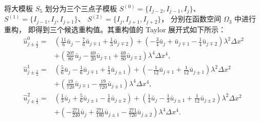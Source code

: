 \documentclass[12pt,a4paper]{article}
\numberwithin{equation}{section}    %
\begin{document}
将大模板 $S_5$ 划分为三个三点子模板
$S^{(0)} = \{I_{j-2}, I_{j-1}, I_j\}$、
$S^{(1)} = \{I_{j-1}, I_j, I_{j+1}\}$、
$S^{(2)} = \{I_j, I_{j+1}, I_{j+2}\}$，
分别在函数空间 $\Omega_3$ 中进行重构，
即得到三个候选重构值。其重构值的 Taylor 展开式如下所示：
\begin{equation}
    \label{eq:substencil_half}
    \begin{aligned}
        \hat{u}^0_{j\pm\frac{1}{2}}
        = & \left(\frac{11}{6}\bar{u}_j - \frac{7}{6}\bar{u}_{j\mp 1}
            + \frac{1}{3}\bar{u}_{j\mp 2}\right)
          + \left(-\frac{3}{4}\bar{u}_j + \bar{u}_{j\mp 1}
            - \frac{1}{4}\bar{u}_{j\mp 2}\right)\lambda^2\Delta x^2 \\
          & + \left(\frac{207}{80}\bar{u}_j - \frac{69}{20}\bar{u}_{j\mp 1}
            + \frac{69}{80}\bar{u}_{j\mp 2}\right)\lambda^4\Delta x^4, \\[6pt]
        \hat{u}^1_{j\pm\frac{1}{2}}
        = & \left(\frac{5}{6}\bar{u}_j - \frac{1}{6}\bar{u}_{j\mp 1}
            + \frac{1}{3}\bar{u}_{j\pm 1}\right)
          + \left(-\frac{1}{12}\bar{u}_{j\mp 1}
            + \frac{1}{12}\bar{u}_{j\pm 1}\right)\lambda^2\Delta x^2 \\
          & + \left(\frac{19}{720}\bar{u}_{j\mp 1}
            - \frac{19}{720}\bar{u}_{j\pm 1}\right)\lambda^4\Delta x^4, \\[6pt]
        \hat{u}^2_{j\pm\frac{1}{2}}
        = & \left(\frac{1}{3}\bar{u}_j + \frac{5}{6}\bar{u}_{j\pm 1}
            - \frac{1}{6}\bar{u}_{j\pm 2}\right)
          + \left(\frac{1}{4}\bar{u}_j - \frac{1}{3}\bar{u}_{j\pm 1}
            + \frac{1}{12}\bar{u}_{j\pm 2}\right)\lambda^2\Delta x^2 \\
          & + \left(-\frac{271}{240}\bar{u}_j + \frac{271}{180}\bar{u}_{j\pm 1}
            - \frac{271}{720}\bar{u}_{j\pm 2}\right)\lambda^4\Delta x^4.
    \end{aligned}
\end{equation}
\end{document}
